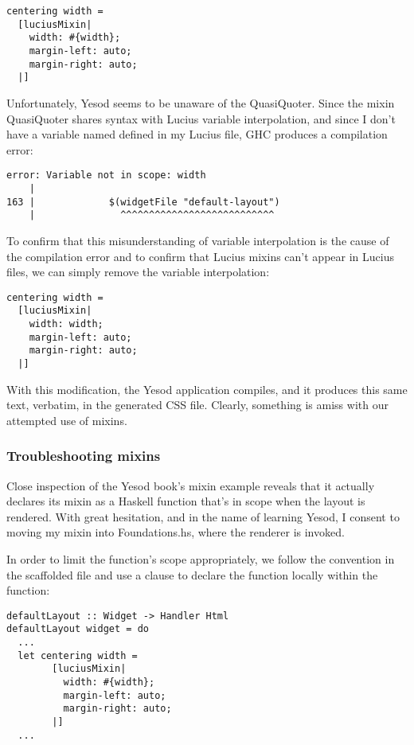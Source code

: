 \begin{Verbatim}[samepage=true]
centering width =
  [luciusMixin|
    width: #{width};
    margin-left: auto;
    margin-right: auto;
  |]
\end{Verbatim}

Unfortunately, Yesod seems to be unaware of the QuasiQuoter. Since the mixin QuasiQuoter shares syntax with Lucius variable interpolation, and since I don't have a variable named  defined in my Lucius file, GHC produces a compilation error:

\begin{Verbatim}[samepage=true]
error: Variable not in scope: width
    |
163 |             $(widgetFile "default-layout")
    |               ^^^^^^^^^^^^^^^^^^^^^^^^^^^

\end{Verbatim}

To confirm that this misunderstanding of variable interpolation is the cause of the compilation error and to confirm that Lucius mixins can't appear in Lucius files, we can simply remove the variable interpolation:

\begin{Verbatim}[samepage=true]
centering width =
  [luciusMixin|
    width: width;
    margin-left: auto;
    margin-right: auto;
  |]
\end{Verbatim}

With this modification, the Yesod application compiles, and it produces this same text, verbatim, in the generated CSS file. Clearly, something is amiss with our attempted use of mixins.

\subsubsection{Troubleshooting mixins} 

Close inspection of the Yesod book's mixin example \cite{ybkShakes} reveals that it actually declares its mixin as a Haskell function that's in scope when the layout is rendered. With great hesitation, and in the name of learning Yesod, I consent to moving my mixin into Foundations.hs, where the renderer is invoked.

In order to limit the function's scope appropriately, we follow the convention in the scaffolded file and use a  clause to declare the function locally within the  function:

\begin{Verbatim}[samepage=true]
defaultLayout :: Widget -> Handler Html
defaultLayout widget = do
  ...
  let centering width =
        [luciusMixin|
          width: #{width};
          margin-left: auto;
          margin-right: auto;
        |]
  ...
\end{Verbatim}

